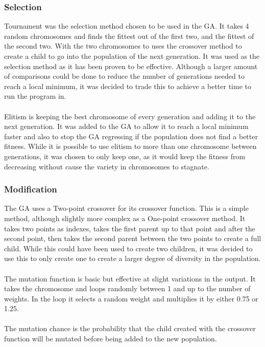 \documentclass[12pt]{article}
\begin{document}
\subsubsection{Selection}
Tournament was the selection method chosen to be used in the GA. It takes 4 random chromosomes and finds the fittest out of the first two, and the fittest of the second two. With the two chromosomes to uses the crossover method to create a child to go into the population of the next generation. It was used as the selection method as it has been proven to be effective\cite{FoundationsOfGA}\cite{GAComparison}. Although a larger amount of comparisons could be done to reduce the number of generations needed to reach a local minimum, it was decided to trade this to achieve a better time to run the program in.\\\\
Elitism is keeping the best chromosome of every generation and adding it to the next generation. It was added to the GA to allow it to reach a local minimum faster and also to stop the GA regressing if the population does not find a better fitness. While it is possible to use elitism to more than one chromosome between generations, it was chosen to only keep one, as it would keep the fitness from decreasing without cause the variety in chromosomes to stagnate.

\subsubsection{Modification}
The GA uses a Two-point crossover for its crossover function. This is a simple 	method, although slightly more complex as a One-point crossover method. It takes two points as indexes, takes the first parent up to that point and after the second point, then takes the second parent between the two points to create a full child. While this could have been used to create two children, it was decided to use this to only create one to create a larger degree of diversity in the population.\\\\
The mutation function is basic but effective at slight variations in the output. It takes the chromosome and loops randomly between 1 and up to the number of weights. In the loop it selects a random weight and multiplies it by either 0.75 or 1.25. \\\\
The mutation chance is the probability that the child created with the crossover function will be mutated before being added to the new population.
\end{document}
